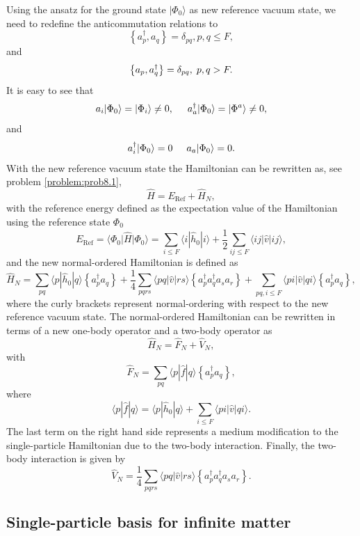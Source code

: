 Using the ansatz for the ground state $\vert \Phi_0\rangle$ as new reference
vacuum state, we need to redefine the anticommutation relations to
\[
\left\{a_p^\dagger, a_q \right\}= \delta_{pq}, p, q \leq F,
\]
and
\[
\left\{a_p, a_q^\dagger \right\} = \delta_{pq}, \hspace{0.1cm} p, q > F.
\]
It is easy to see that
\[
        a_i|\Phi_0\rangle = |\Phi_i\rangle\ne 0, \hspace{0.5cm}
        a_a^\dagger|\Phi_0\rangle = |\Phi^a\rangle\ne 0,
\]
and
\[
a_i^\dagger|\Phi_0\rangle = 0 \hspace{0.5cm} a_a|\Phi_0\rangle = 0.
\]
With the new reference vacuum state the Hamiltonian can be rewritten
as, see problem \ref{problem:prob8.1},
\[
\hat{H}=E_{\mathrm{Ref}}+\hat{H}_N,
\]
with the reference energy defined as the expectation value of the
Hamiltonian using the reference state $\Phi_0$
\[
E_{\mathrm{Ref}}=\langle \Phi_0 \vert \hat{H} \vert \Phi_0\rangle =
\sum_{i\le F} \langle i|\hat{h}_0|i\rangle + \frac{1}{2} \sum_{ij\le
  F}\langle ij|\hat{v}|ij\rangle,
\]
and the new normal-ordered Hamiltonian is defined as
\begin{equation}\label{eq:Hnormalorder}
\hat{H}_N = \sum_{pq} \langle p|\hat{h}_0|q\rangle \left\{a^\dagger_p
a_q\right\}+\frac{1}{4} \sum_{pqrs} \langle pq|\hat{v}|rs\rangle
\left\{a^\dagger_p a^\dagger_q a_s a_r\right\}+\sum_{pq,i\le F}
\langle pi|\hat{v}|qi\rangle \left\{a^\dagger_p a_q\right\},
\end{equation}
where the curly brackets represent normal-ordering with respect to the
new reference vacuum state.  The normal-ordered Hamiltonian can be
rewritten in terms of a new one-body operator and a two-body operator
as
\[
\hat{H}_N=\hat{F}_N+\hat{V}_N,
\]
with
\begin{equation}\label{eq:hfn}
\hat{F}_N=\sum_{pq} \langle p|\hat{f}|q\rangle \left\{a^\dagger_pa_q\right\},
\end{equation}
where
\[
\langle p|\hat{f}|q\rangle= \langle p|\hat{h}_0|q\rangle +\sum_{i\le F}
\langle pi|\hat{v}|qi\rangle.
\]
The last term on the right hand side represents a medium modification
to the single-particle Hamiltonian due to the two-body interaction.
Finally, the two-body interaction is given by
\begin{equation}\label{eq:hvn}	     
\hat{V}_N = \frac{1}{4} \sum_{pqrs} \langle pq|\hat{v}|rs\rangle
\left\{a^\dagger_p a^\dagger_q a_s a_r\right\}.
\end{equation}	     

\subsection{Single-particle basis for infinite matter}

